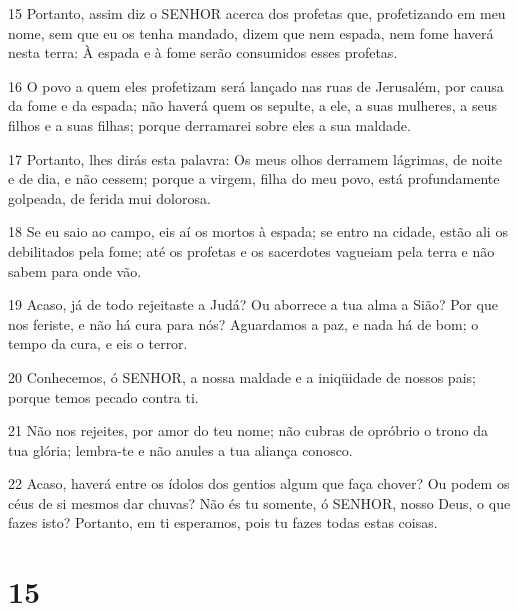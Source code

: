 \par 15 Portanto, assim diz o SENHOR acerca dos profetas que, profetizando em meu nome, sem que eu os tenha mandado, dizem que nem espada, nem fome haverá nesta terra: À espada e à fome serão consumidos esses profetas.
\par 16 O povo a quem eles profetizam será lançado nas ruas de Jerusalém, por causa da fome e da espada; não haverá quem os sepulte, a ele, a suas mulheres, a seus filhos e a suas filhas; porque derramarei sobre eles a sua maldade.
\par 17 Portanto, lhes dirás esta palavra: Os meus olhos derramem lágrimas, de noite e de dia, e não cessem; porque a virgem, filha do meu povo, está profundamente golpeada, de ferida mui dolorosa.
\par 18 Se eu saio ao campo, eis aí os mortos à espada; se entro na cidade, estão ali os debilitados pela fome; até os profetas e os sacerdotes vagueiam pela terra e não sabem para onde vão.
\par 19 Acaso, já de todo rejeitaste a Judá? Ou aborrece a tua alma a Sião? Por que nos feriste, e não há cura para nós? Aguardamos a paz, e nada há de bom; o tempo da cura, e eis o terror.
\par 20 Conhecemos, ó SENHOR, a nossa maldade e a iniqüidade de nossos pais; porque temos pecado contra ti.
\par 21 Não nos rejeites, por amor do teu nome; não cubras de opróbrio o trono da tua glória; lembra-te e não anules a tua aliança conosco.
\par 22 Acaso, haverá entre os ídolos dos gentios algum que faça chover? Ou podem os céus de si mesmos dar chuvas? Não és tu somente, ó SENHOR, nosso Deus, o que fazes isto? Portanto, em ti esperamos, pois tu fazes todas estas coisas.

\chapter{15}

